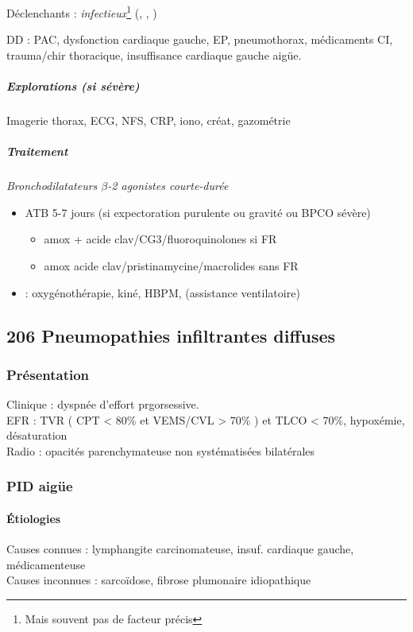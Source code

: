 \documentclass[11pt]{article}
\begin{document}
Déclenchants : \emph{infectieux}\footnote{Mais souvent pas de facteur précis} 
(, , )

DD : PAC, dysfonction cardiaque gauche, EP, pneumothorax, médicaments CI, trauma/chir thoracique, insuffisance cardiaque gauche aigüe.

\subparagraph{Explorations (si sévère)}
\label{sec:orgae7f1d4}
Imagerie thorax, ECG, NFS, CRP, iono, créat, gazométrie

\subparagraph{Traitement}
\label{sec:org7207ba6}
\emph{Bronchodilatateurs \(\beta\)-2 agonistes courte-durée} 
\begin{itemize}
\item \textpm{} ATB 5-7 jours (si expectoration
purulente ou gravité ou BPCO sévère) 
\begin{itemize}
\item amox + acide clav/CG3/fluoroquinolones si FR
\item amox \textpm{} acide clav/pristinamycine/macrolides sans FR
\end{itemize}
\item \faHospitalO : oxygénothérapie, kiné, HBPM, (assistance ventilatoire)
\end{itemize}

\subsection{206 \textdagger{} Pneumopathies infiltrantes diffuses}
\label{sec:orgaca27fb}
\subsubsection{Présentation}
\label{sec:org4ed3cf5}
Clinique : dyspnée d'effort prgorsessive.\\
EFR : \gls{TVR} ( CPT < 80\% et VEMS/CVL >
70\% ) et TLCO < 70\%, hypoxémie, désaturation\\
Radio : opacités parenchymateuse non systématisées bilatérales

\subsubsection{PID aigüe}
\label{sec:org56d860b}
\paragraph{Étiologies}
\label{sec:orgeca8e6f}
Causes connues : lymphangite carcinomateuse, insuf. cardiaque gauche, médicamenteuse\\
Causes inconnues : sarcoïdose, fibrose plumonaire idiopathique
\end{document}
